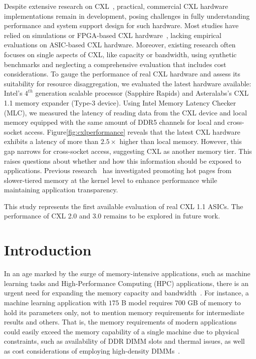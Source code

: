 Despite extensive research on CXL~\cite{cxl_azure,cxlcentric,demystify}, practical, commercial CXL hardware implementations remain in development, posing challenges in fully understanding performance and system support design for such hardware. Most studies have relied on simulations or FPGA-based CXL hardware~\cite{demystify,intelfpga}, lacking empirical evaluations on ASIC-based CXL hardware. Moreover, existing research often focuses on single aspects of CXL, like capacity or bandwidth, using synthetic benchmarks and neglecting a comprehensive evaluation that includes cost considerations. To gauge the performance of real CXL hardware and assess its suitability for resource disaggregation, we evaluated the latest hardware available: Intel's $\text{4}^{th}$ generation scalable processor (Sapphire Rapids) and Asteralabs's CXL 1.1 memory expander (Type-3 device). Using Intel Memory Latency Checker (MLC)\cite{mlc}, we measured the latency of reading data from the CXL device and local memory equipped with the same amount of DDR5 channels for local and cross-socket access. Figure\ref{fig:cxlperformance} reveals that the latest CXL hardware exhibits a latency of more than $2.5\times$ higher than local memory. However, this gap narrows for cross-socket access, suggesting CXL as another memory tier. This raises questions about whether and how this information should be exposed to applications. Previous research~\cite{tpp} has investigated promoting hot pages from slower-tiered memory at the kernel level to enhance performance while maintaining application transparency.

This study represents the first available evaluation of real CXL 1.1 ASICs. The performance of CXL 2.0 and 3.0 remains to be explored in future work.



\section{Introduction}
\label{sec:intro}

In an age marked by the surge of memory-intensive applications, such as machine learning tasks and High-Performance Computing (HPC) applications, there is an urgent need for expanding the memory capacity and bandwidth~\cite{dataintensive, FlatFlash, cxl-ssd}. 
For instance, a machine learning application with $175$ B model requires $700$ GB of memory to hold its parameters only, not to mention memory requirements for intermediate results and others. That is, the memory requirements of modern applications could easily exceed the memory capability of a single machine due to physical constraints, such as availability of DDR DIMM slots and thermal issues, as well as cost considerations of employing high-density DIMMs~\cite{FlatFlash, cxl-ssd}.

